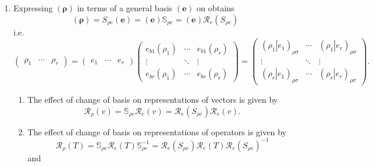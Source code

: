 \documentclass[aps,preprint]{revtex4}
\begin{document}
\begin{enumerate}
\item Expressing $\left( \boldsymbol{\rho }\right) $ in terms of a general
basis $\left( \boldsymbol{e}\right) $ on obtains 
\begin{equation}
\left( \boldsymbol{\rho }\right) =S_{\rho e}\left( \boldsymbol{e}\right)
=\left( \boldsymbol{e}\right) \mathbb{S}_{\rho e}=\left( \boldsymbol{e}%
\right) \mathcal{R}_{e}\left( S_{\rho e}\right)
\end{equation}%
i.e. 
\begin{equation}
\left( 
\begin{array}{ccc}
\rho _{1} & \cdots & \rho _{r}%
\end{array}%
\right) =\left( 
\begin{array}{ccc}
e_{1} & \cdots & e_{r}%
\end{array}%
\right) \left( 
\begin{array}{ccc}
e_{b1}\left( \rho _{1}\right) & \cdots & e_{b1}\left( \rho _{r}\right) \\ 
\vdots & \ddots & \vdots \\ 
e_{br}\left( \rho _{1}\right) & \cdots & e_{br}\left( \rho _{r}\right)%
\end{array}%
\right) =\left( 
\begin{array}{ccc}
\left( \left. \rho _{1}\right\vert e_{1}\right) _{\rho \sigma } & \cdots & 
\left( \left. \rho _{1}\right\vert e_{r}\right) _{\rho \sigma } \\ 
\vdots & \ddots & \vdots \\ 
\left( \left. \rho _{r}\right\vert e_{1}\right) _{\rho \sigma } & \cdots & 
\left( \left. \rho _{r}\right\vert e_{r}\right) _{\rho \sigma }%
\end{array}%
\right) .
\end{equation}

\begin{enumerate}
\item The effect of change of basis on representations of vectors is given by%
\begin{equation}
\mathcal{R}_{\rho }\left( v\right) =\mathbb{S}_{\rho e}\mathcal{R}_{e}\left(
v\right) =\mathcal{R}_{e}\left( S_{\rho e}\right) \mathcal{R}_{e}\left(
v\right) .
\end{equation}

\item The effect of change of basis on representations of operators is given
by 
\begin{equation}
\mathcal{R}_{\rho }\left( T\right) =\mathbb{S}_{\rho e}\mathcal{R}_{e}\left(
T\right) \mathbb{S}_{\rho e}^{-1}=\mathcal{R}_{e}\left( S_{\rho e}\right) 
\mathcal{R}_{e}\left( T\right) \mathcal{R}_{e}\left( S_{\rho e}\right) ^{-1}
\end{equation}%
and


\end{enumerate}
\end{enumerate}
\end{document}
